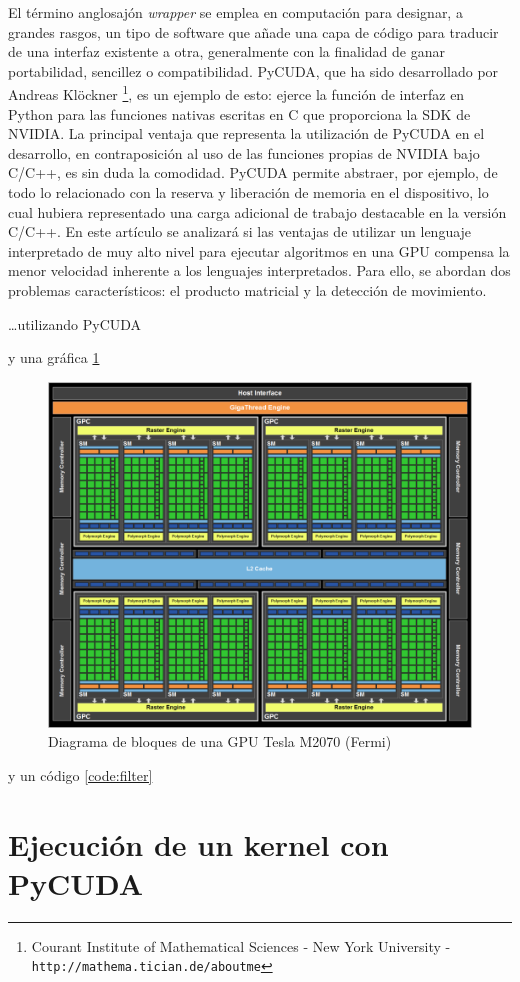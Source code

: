 \documentclass[twocolumn,twoside]{Jornadas}
\begin{document}
El término anglosajón \emph{wrapper} se emplea en computación para designar, a grandes rasgos, un tipo de software que añade una capa de código para traducir de una interfaz existente a otra, generalmente con la finalidad de ganar portabilidad, sencillez o compatibilidad. PyCUDA, que ha sido desarrollado por Andreas Klöckner \footnote[2]{Courant Institute of Mathematical Sciences - New York University - {\tt http://mathema.tician.de/aboutme}}, es un ejemplo de esto: ejerce la función de interfaz en Python para las funciones nativas escritas en C que proporciona la SDK de NVIDIA. La principal ventaja que representa la utilización de PyCUDA en el desarrollo, en contraposición al uso de las funciones propias de NVIDIA bajo C/C++, es sin duda la comodidad. PyCUDA permite abstraer, por ejemplo, de todo lo relacionado con la reserva y liberación de memoria en el dispositivo, lo cual hubiera representado una carga adicional de trabajo destacable en la versión C/C++. En este artículo se analizará si las ventajas de utilizar un lenguaje interpretado de muy alto nivel para ejecutar algoritmos en una GPU compensa la menor velocidad inherente a los lenguajes interpretados.
Para ello, se abordan dos problemas característicos: el producto matricial y la detección de movimiento.

\ldots utilizando PyCUDA~\cite{DBLP:journals/corr/abs-0911-3456}

y una gráfica \ref{fig:Fermi}

\begin{figure}
	\includegraphics[width=.45\textwidth]{block_diagram_Fermi}
	\caption{\label{fig:Fermi} Diagrama de bloques de una GPU Tesla M2070 (Fermi)}
\end{figure}

y un código \ref{code:filter}

\section{Ejecución de un kernel con PyCUDA}
\end{document}
